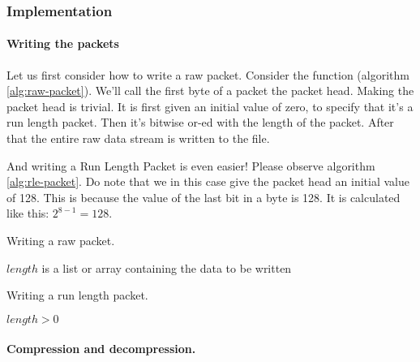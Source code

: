 \begin{refsection}
\subsubsection{Implementation}
\label{sec:implementation}

\paragraph{Writing the packets}
\label{sec:writing-packets}

Let us first consider how to write a raw packet. Consider the function
(algorithm \ref{alg:raw-packet}). We'll
call the first byte of a packet the packet head. Making the packet head
is trivial. It is first given an initial value of zero, to specify
that it's a run length packet. Then it's bitwise or-ed with the length
of the packet. After that the entire raw data stream is written to the
file.

And writing a Run Length Packet is even easier! Please observe
algorithm \ref{alg:rle-packet}. Do note that we in this case give the
packet head an initial value of 128. This is because the value of the
last bit in a byte is 128. It is calculated like this: $2^{8-1} =
128$.

\begin{algorithm}[h]
  \caption{Writing a raw packet.}
  \label{alg:raw-packet}
  \begin{algorithmic}[1]
    \Require $length$ is a list or array containing the data to be written
      \State {}
        \State {}
      \EndForEach
    \EndFunction
  \end{algorithmic}
\end{algorithm}

\begin{algorithm}[h]
  \caption{Writing a run length packet.}
  \label{alg:rle-packet}
  \begin{algorithmic}[1]
    \Require $length > 0$
      \State {}
      \State {}
    \EndFunction
  \end{algorithmic}
\end{algorithm}

\paragraph{Compression and decompression.}
\label{sec:compr-decompr}


\end{refsection}
